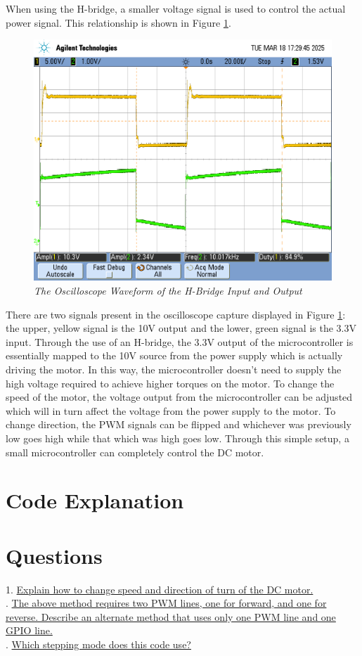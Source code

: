 \documentclass[CMPE]{KGCOEReport}
\begin{document}
When using the H-bridge, a smaller voltage signal is used to control the 
actual power signal. This relationship is shown in Figure \ref{fig:part1_2}.
\begin{figure}[H]
    \centering
    \includegraphics[width=1\textwidth]{Images/part1_2.png} %
    \caption{\textit{The Oscilloscope Waveform of the H-Bridge Input and Output}}
    \label{fig:part1_2}
\end{figure}
There are two signals present in the oscilloscope capture displayed in Figure 
\ref{fig:part1_2}: the upper, yellow signal is the 10V output and the lower, 
green signal is the 3.3V input. Through the use of an H-bridge, the 3.3V 
output of the microcontroller is essentially mapped to the 10V source from the
 power supply which is actually driving the motor. In this way, the 
 microcontroller doesn't need to supply the high voltage required to achieve 
 higher torques on the motor. To change the speed of the motor, the voltage 
 output from the microcontroller can be adjusted which will in turn affect the
  voltage from the power supply to the motor. To change direction, the PWM 
  signals can be flipped and whichever was previously low goes high while that
   which was high goes low. Through this simple setup, a small microcontroller
    can completely control the DC motor.

\section*{Code Explanation}

\section*{Questions}
\setlength{\parindent}{20pt}
1. \underline{Explain how to change speed and direction of turn of the DC 
motor.} \\
. \underline{The above method requires two PWM lines, one for forward, and
one for reverse. Describe an alternate method that uses only one PWM line and
one GPIO line.} \\
. \underline{Which stepping mode does this code use?} \\
\indent 
\end{document}
